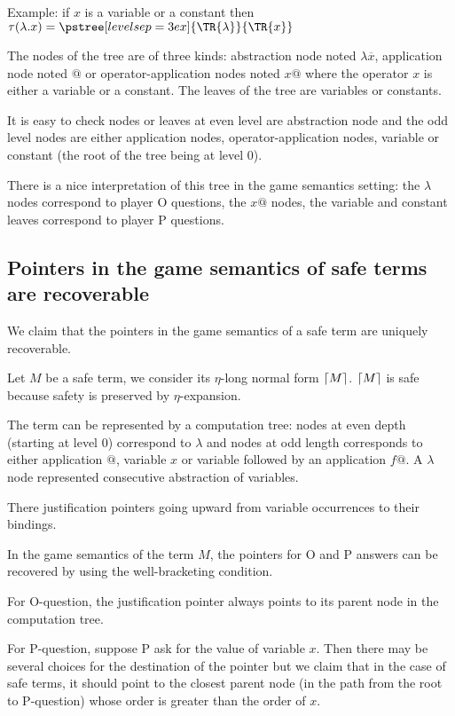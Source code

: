 Example: if $x$ is a variable or a constant then
$ \cmptre{\lambda . x} =
  \pstree[levelsep=3ex]
    { \TR{\lambda } }
    { \TR{x}
    }$

The nodes of the tree are of three kinds: abstraction node noted $\lambda \overline{x}$,
application node noted $@$ or operator-application nodes noted $x @$ where the operator $x$
is either a variable or a constant.
The leaves of the tree are variables or constants.


It is easy to check nodes or leaves at even level are abstraction node
and the odd level nodes are either application nodes, operator-application nodes, variable
or constant (the root of the tree being at level $0$).


There is a nice interpretation of this tree in the game semantics setting: the $\lambda$ nodes
correspond to player O questions, the $x @$ nodes, the variable and constant leaves
correspond to player P questions.


\subsection{Pointers in the game semantics of safe terms are recoverable}

We claim that the pointers in the game semantics of a safe term are
uniquely recoverable.

Let $M$ be a safe term, we consider its $\eta$-long normal form $\lceil M\rceil$.
$\lceil M\rceil$ is safe because safety is preserved by $\eta$-expansion.


The term can be represented by a computation tree: nodes at even
depth (starting at level 0) correspond to $\lambda$ and nodes at odd
length corresponds to either application $@$, variable $x$ or
variable followed by an application $f@$. A $\lambda$ node
represented consecutive abstraction of variables.

There justification pointers going upward from variable occurrences
to their bindings.

In the game semantics of the term $M$, the pointers for O and P
answers can be recovered by using the well-bracketing condition.

For O-question, the justification pointer always points to its
parent node in the computation tree.

For P-question, suppose P ask for the value of variable $x$. Then
there may be several choices for the destination of the pointer but
we claim that in the case of safe terms, it should point to the
closest parent node (in the path from the root to P-question) whose
order is greater than the order of $x$.

